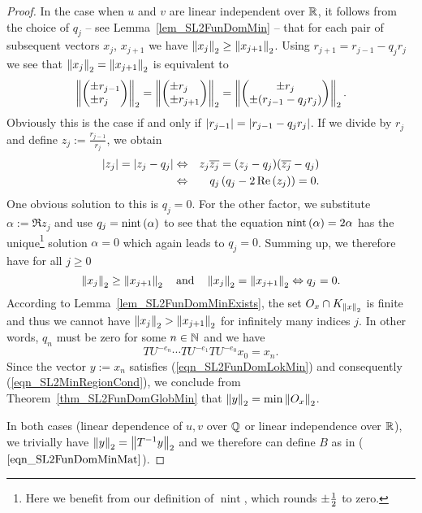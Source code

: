 \begin{proof}
In the case when $u$ and $v$ are linear independent over $\mathbb{R}$, it follows from the choice of $q_j$ -- see Lemma~\ref{lem_SL2FunDomMin} -- that for each pair of subsequent vectors $x_j$, $x_{j+1}$ we have $\left\| x_j \right\|_2 \ge \left\| x_{j+1} \right\|_2$. Using $r_{j+1} = r_{j-1} - q_j r_j$ we see that $\left\| x_j \right\|_2 = \left\| x_{j+1} \right\|_2$ is equivalent to
\begin{equation*}
\left\| \begin{pmatrix}\pm r_{j-1} \\ \pm r_{j\phantom{-1}}\end{pmatrix} \right\|_2 = 
\left\| \begin{pmatrix}\pm r_{j\phantom{+1}} \\ \pm r_{j+1}\end{pmatrix} \right\|_2 =
\left\| \begin{pmatrix}\pm r_j \\ \pm (r_{j-1} - q_j r_j)\end{pmatrix} \right\|_2.
\end{equation*}
Obviously this is the case if and only if $\left|r_{j-1}\right| = \left|r_{j-1}-q_j r_j\right|$. If we divide by $r_j$ and define $z_j := \frac{r_{j-1}}{r_j}$, we obtain
\begin{eqnarray*}
\left|z_j\right| = \left|z_j - q_j\right| 
&\Leftrightarrow& z_j \overline{z_j} = (z_j - q_j)(\overline{z_j} -q_j)\\
&\Leftrightarrow& q_j \left(q_j - 2\operatorname{Re}\left(z_j\right)\right) = 0.
\end{eqnarray*}
One obvious solution to this is $q_j = 0$. For the other factor, we substitute $\alpha := \Re{z_j}$ and use $q_j = \operatorname{nint}\left( \alpha \right)$ to see that the equation $\operatorname{nint}\left( \alpha \right) = 2 \alpha$ has the unique\footnote{Here we benefit from our definition of $\operatorname{nint}$, which rounds $\pm \frac{1}{2}$ to zero.} solution $\alpha = 0$ which again leads to $q_j = 0$. Summing up, we therefore have for all $j \ge 0$
\begin{equation}
\label{eqn_SL2FunDomAlgNormDec}
\left\| x_j \right\|_2 \ge \left\| x_{j+1} \right\|_2 
\quad \text{and} \quad
\left\| x_j \right\|_2 = \left\| x_{j+1} \right\|_2 \Leftrightarrow q_j = 0.
\end{equation}
According to Lemma~{\ref{lem_SL2FunDomMinExists}}, the set $O_x \cap K_{\left\| x \right\|_2}$ is finite and thus we cannot have $\left\| x_j \right\|_2 > \left\| x_{j+1} \right\|_2$ for infinitely many indices $j$. In other words, $q_n$ must be zero for some $n \in \mathbb{N}$ and we have
\begin{equation*}
TU^{-e_n} \cdots TU^{-e_1} TU^{-e_0} x_0 = x_n.
\end{equation*}
Since the vector $y := x_n$ satisfies (\ref{eqn_SL2FunDomLokMin}) and consequently ({\ref{eqn_SL2MinRegionCond}}), we conclude from  Theorem~\ref{thm_SL2FunDomGlobMin} that $\left\| y \right\|_2 = \min{\left\| O_x \right\|_2}$. 

In both cases (linear dependence of $u,v$ over $\mathbb{Q}$ or linear independence over $\mathbb{R}$), we trivially have $\left\| y \right\|_2 = \left\| {T}^{-1}y \right\|_2$ and we therefore can define $B$ as in ($\ref{eqn_SL2FunDomMinMat}$).
\end{proof}

